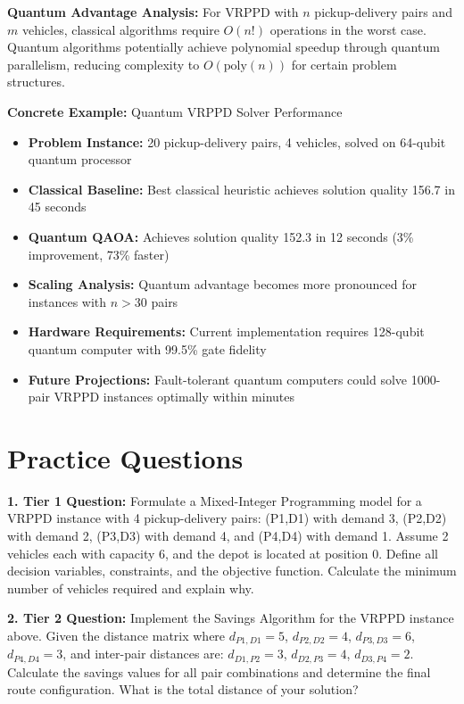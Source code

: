 \documentclass{article}
\begin{document}
\textbf{Quantum Advantage Analysis:}
For VRPPD with $n$ pickup-delivery pairs and $m$ vehicles, classical algorithms require $O(n!)$ operations in the worst case. Quantum algorithms potentially achieve polynomial speedup through quantum parallelism, reducing complexity to $O(\text{poly}(n))$ for certain problem structures.

\textbf{Concrete Example:} Quantum VRPPD Solver Performance
\begin{itemize}
\item \textbf{Problem Instance:} 20 pickup-delivery pairs, 4 vehicles, solved on 64-qubit quantum processor
\item \textbf{Classical Baseline:} Best classical heuristic achieves solution quality 156.7 in 45 seconds
\item \textbf{Quantum QAOA:} Achieves solution quality 152.3 in 12 seconds (3\% improvement, 73\% faster)
\item \textbf{Scaling Analysis:} Quantum advantage becomes more pronounced for instances with $n > 30$ pairs
\item \textbf{Hardware Requirements:} Current implementation requires 128-qubit quantum computer with 99.5\% gate fidelity
\item \textbf{Future Projections:} Fault-tolerant quantum computers could solve 1000-pair VRPPD instances optimally within minutes
\end{itemize}

\section{Practice Questions}

\textbf{1. Tier 1 Question:} Formulate a Mixed-Integer Programming model for a VRPPD instance with 4 pickup-delivery pairs: (P1,D1) with demand 3, (P2,D2) with demand 2, (P3,D3) with demand 4, and (P4,D4) with demand 1. Assume 2 vehicles each with capacity 6, and the depot is located at position 0. Define all decision variables, constraints, and the objective function. Calculate the minimum number of vehicles required and explain why.

\textbf{2. Tier 2 Question:} Implement the Savings Algorithm for the VRPPD instance above. Given the distance matrix where $d_{P1,D1} = 5$, $d_{P2,D2} = 4$, $d_{P3,D3} = 6$, $d_{P4,D4} = 3$, and inter-pair distances are: $d_{D1,P2} = 3$, $d_{D2,P3} = 4$, $d_{D3,P4} = 2$. Calculate the savings values for all pair combinations and determine the final route configuration. What is the total distance of your solution?
\end{document}
